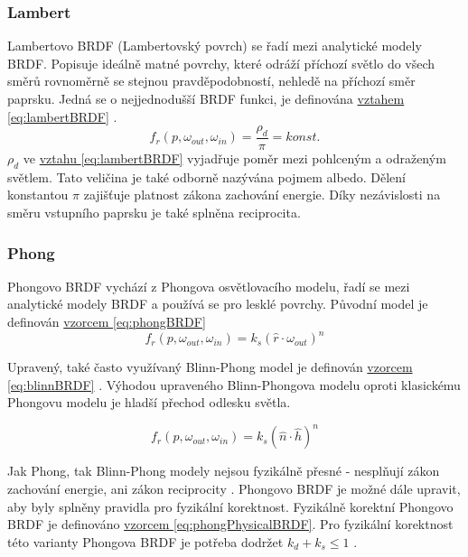 \documentclass[czech,master,dept460,male,cpp,cpdeclaration]{diploma}
\newcommand{\uvec}[1]{\hat{#1}}
\begin{document}
\subsubsection{Lambert}
Lambertovo BRDF (Lambertovský povrch) se řadí mezi analytické modely BRDF. Popisuje ideálně matné povrchy, které odráží příchozí světlo do všech směrů rovnoměrně se stejnou pravděpodobností, nehledě na příchozí směr paprsku. Jedná se o nejjednodušší BRDF funkci, je definována \hyperref[eq:lambertBRDF]{vztahem \ref{eq:lambertBRDF}} \cite{Koppal2014}.
\begin{equation} \label{eq:lambertBRDF}
    f_r\left(p,\omega_{out},\omega_{in}\right) = \frac{\rho_d}{\pi} = konst.
\end{equation}
$\rho_d$ ve \hyperref[eq:lambertBRDF]{vztahu \ref{eq:lambertBRDF}} vyjadřuje poměr mezi pohlceným a odraženým světlem. Tato veličina je také odborně nazývána pojmem albedo. Dělení konstantou $\pi$ zajišťuje platnost zákona zachování energie. Díky nezávislosti na směru vstupního paprsku je také splněna reciprocita. 

\subsubsection{Phong} \label{sec:Phong}
Phongovo BRDF vychází z Phongova osvětlovacího modelu, řadí se mezi analytické modely BRDF a používá se pro lesklé povrchy. Původní model je definován \hyperref[eq:phongBRDF]{vzorcem \ref{eq:phongBRDF}} \cite{Phong1975}
\begin{equation} \label{eq:phongBRDF}
    f_r\left(p,\omega_{out},\omega_{in}\right) = k_s(\uvec{r}\cdot\omega_{out})^n
\end{equation}

Upravený, také často využívaný Blinn-Phong model je definován \hyperref[eq:blinnBRDF]{vzorcem \ref{eq:blinnBRDF}} \cite{BlinnPhong1977}. Výhodou upraveného Blinn-Phongova modelu oproti klasickému Phongovu modelu je hladší přechod odlesku světla. 

\begin{equation} \label{eq:blinnBRDF}
    f_r\left(p,\omega_{out},\omega_{in}\right) = k_s(\uvec{n}\cdot\uvec{h})^n
\end{equation}

Jak Phong, tak Blinn-Phong modely nejsou fyzikálně přesné - nesplňují zákon zachování energie, ani zákon reciprocity \cite{BRDFOverview}. Phongovo BRDF je možné dále upravit, aby byly splněny pravidla pro fyzikální korektnost. Fyzikálně korektní Phongovo BRDF je definováno \hyperref[eq:phongPhysicalBRDF]{vzorcem \ref{eq:phongPhysicalBRDF}}. Pro fyzikální korektnost této varianty Phongova BRDF je potřeba dodržet $k_d + k_s \leq 1$ \cite{LaFortunePhongBRDF}.
\end{document}
